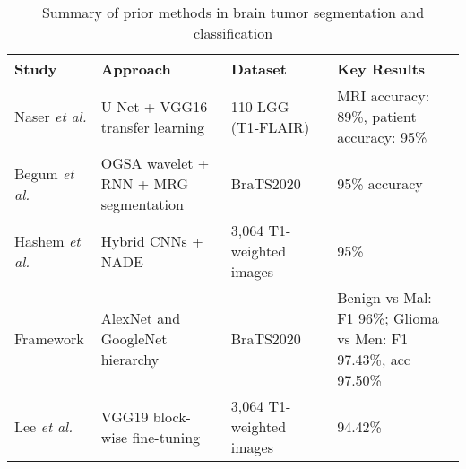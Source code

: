 \begin{table}[ht]
  \centering
  \caption{Summary of prior methods in brain tumor segmentation and classification}
  \label{tab:related-work-summary}
  \begin{tabular}{p{} p{} p{} p{}}
    \hline
    \textbf{Study}                                       & \textbf{Approach} & \textbf{Dataset} & \textbf{Key Results} \\
    \hline
    \vspace{0.1cm} Naser \emph{et al.}                   &
    \vspace{0.1cm} U-Net + VGG16 transfer learning       &
    \vspace{0.1cm} 110 LGG (T1‑FLAIR)                    &
    \vspace{0.1cm} MRI accuracy: 89\%, patient accuracy: 95\%                                                          \\
    \hline
    \vspace{0.1cm} Begum \emph{et al.}                   &
    \vspace{0.1cm} OGSA wavelet + RNN + MRG segmentation &
    \vspace{0.1cm} BraTS2020                             &
    \vspace{0.1cm} 95\% accuracy                                                                                       \\
    \hline
    \vspace{0.1cm} Hashem \emph{et al.}                  &
    \vspace{0.1cm} Hybrid CNNs + NADE                    &
    \vspace{0.1cm} 3,064 T1-weighted images              &
    \vspace{0.1cm} 95\%                                                                                                \\
    \hline
    \vspace{0.1cm} Framework                             &
    \vspace{0.1cm} AlexNet and GoogleNet hierarchy       &
    \vspace{0.1cm} BraTS2020                             &
    \vspace{0.1cm} Benign vs Mal: F1 96\%;
    \vspace{0.1cm} Glioma vs Men: F1 97.43\%, acc 97.50\%                                                              \\
    \hline
    \vspace{0.1cm} Lee \emph{et al.}                     &
    \vspace{0.1cm} VGG19 block-wise fine-tuning          &
    \vspace{0.1cm} 3,064 T1-weighted images              &
    \vspace{0.1cm} 94.42\%                                                                                             \\
    \hline
  \end{tabular}
\end{table}

